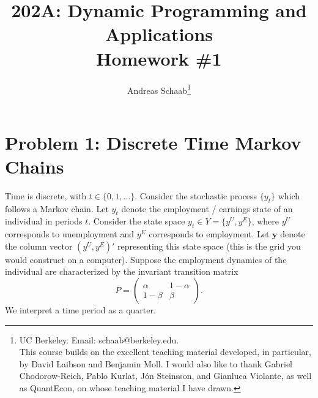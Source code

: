 \documentclass[11pt]{extarticle}
\title{202A: Dynamic Programming and Applications\\[5pt] {\Large \textbf{Homework \#1}}}
\author{Andreas Schaab\footnote{
	UC Berkeley. Email: schaab@berkeley.edu.\\
	This course builds on the excellent teaching material developed, in particular, by David Laibson and Benjamin Moll. I would also like to thank Gabriel Chodorow-Reich, Pablo Kurlat, J\'on Steinsson, and Gianluca Violante, as well as QuantEcon, on whose teaching material I have drawn. 
}}
\date{}
\theoremstyle{plain}
\theoremstyle{definition}
\begin{document}
\maketitle


\section*{Problem 1: Discrete Time Markov Chains}

Time is discrete, with $t \in \{0, 1, ...\}$. Consider the stochastic process $\{ y_t \}$ which follows a Markov chain. Let $y_t$ denote the employment / earnings state of an individual in periods $t$. Consider the state space $y_t \in Y = \{ y^U, y^E \}$, where $y^U$ corresponds to unemployment and $y^E$ corresponds to employment. Let $\bm y$ denote the column vector $(y^U, y^E)'$ representing this state space (this is the grid you would construct on a computer). Suppose the employment dynamics of the individual are characterized by the invariant transition matrix 
\begin{equation*}
	P = \begin{pmatrix} \alpha & 1 - \alpha \\ 1 - \beta & \beta \end{pmatrix}.
\end{equation*}
We interpret a time period as a quarter. 
\end{document}
